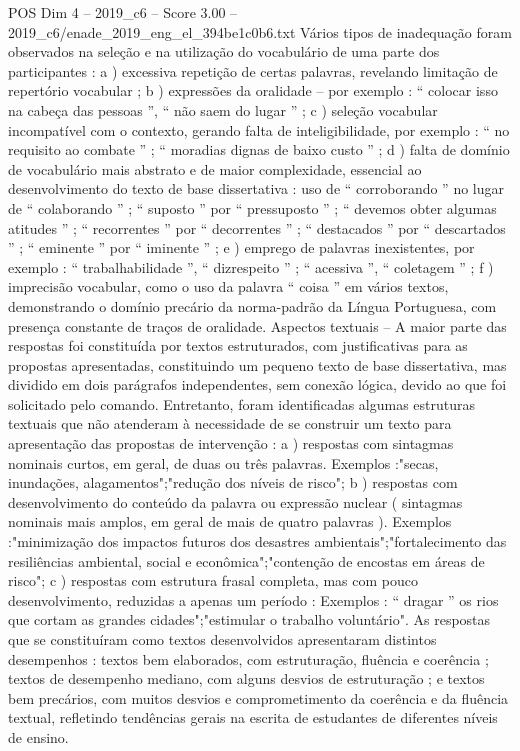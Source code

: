 \begin{textsample}{POS Dim 4 – 2019\_c6 – Score 3.00 – 2019\_c6/enade\_2019\_eng\_el\_394be1c0b6.txt}
Vários tipos de inadequação foram observados na seleção e na utilização do vocabulário de uma parte dos participantes : a ) excessiva repetição de certas palavras, revelando limitação de repertório vocabular ; b ) expressões da oralidade – por exemplo : “ colocar isso na cabeça das pessoas ”, “ não saem do lugar ” ; c ) seleção vocabular incompatível com o contexto, gerando falta de inteligibilidade, por exemplo : “ no requisito ao combate ” ; “ moradias dignas de baixo custo ” ; d ) falta de domínio de vocabulário mais abstrato e de maior complexidade, essencial ao desenvolvimento do texto de base dissertativa : uso de “ corroborando ” no lugar de “ colaborando ” ; “ suposto ” por “ pressuposto ” ; “ devemos obter algumas atitudes ” ; “ recorrentes ” por “ decorrentes ” ; “ destacados ” por “ descartados ” ; “ eminente ” por “ iminente ” ; e ) emprego de palavras inexistentes, por exemplo : “ trabalhabilidade ”, “ dizrespeito ” ; “ acessiva ”, “ coletagem ” ; f ) imprecisão vocabular, como o uso da palavra “ coisa ” em vários textos, demonstrando o domínio precário da norma-padrão da Língua Portuguesa, com presença constante de traços de oralidade.
Aspectos textuais – A maior parte das respostas foi constituída por textos estruturados, com justificativas para as propostas apresentadas, constituindo um pequeno texto de base dissertativa, mas dividido em dois parágrafos independentes, sem conexão lógica, devido ao que foi solicitado pelo comando.
Entretanto, foram identificadas algumas estruturas textuais que não atenderam à necessidade de se construir um texto para apresentação das propostas de intervenção : a ) respostas com sintagmas nominais curtos, em geral, de duas ou três palavras.
Exemplos :"secas, inundações, alagamentos";"redução dos níveis de risco"; b ) respostas com desenvolvimento do conteúdo da palavra ou expressão nuclear ( sintagmas nominais mais amplos, em geral de mais de quatro palavras ).
Exemplos :"minimização dos impactos futuros dos desastres ambientais";"fortalecimento das resiliências ambiental, social e econômica";"contenção de encostas em áreas de risco"; c ) respostas com estrutura frasal completa, mas com pouco desenvolvimento, reduzidas a apenas um período : Exemplos : “ dragar ” os rios que cortam as grandes cidades";"estimular o trabalho voluntário".
As respostas que se constituíram como textos desenvolvidos apresentaram distintos desempenhos : textos bem elaborados, com estruturação, fluência e coerência ; textos de desempenho mediano, com alguns desvios de estruturação ; e textos bem precários, com muitos desvios e comprometimento da coerência e da fluência textual, refletindo tendências gerais na escrita de estudantes de diferentes níveis de ensino.

\end{textsample}
